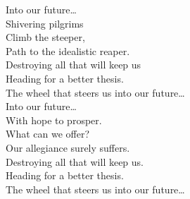 Into our future… \\

Shivering pilgrims \\
Climb the steeper, \\
Path to the idealistic reaper. \\
Destroying all that will keep us \\
Heading for a better thesis. \\

The wheel that steers us into our future… \\

Into our future… \\

With hope to prosper. \\
What can we offer? \\
Our allegiance surely suffers. \\
Destroying all that will keep us. \\
Heading for a better thesis. \\

The wheel that steers us into our future… \\
